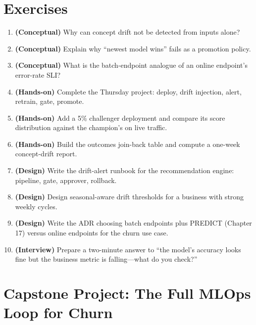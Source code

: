\section{Exercises}
\begin{enumerate}
    \item \textbf{(Conceptual)} Why can concept drift not be detected from inputs alone?
    \item \textbf{(Conceptual)} Explain why ``newest model wins'' fails as a promotion policy.
    \item \textbf{(Conceptual)} What is the batch-endpoint analogue of an online endpoint's error-rate SLI?
    \item \textbf{(Hands-on)} Complete the Thursday project: deploy, drift injection, alert, retrain, gate, promote.
    \item \textbf{(Hands-on)} Add a 5\% challenger deployment and compare its score distribution against the champion's on live traffic.
    \item \textbf{(Hands-on)} Build the outcomes join-back table and compute a one-week concept-drift report.
    \item \textbf{(Design)} Write the drift-alert runbook for the recommendation engine: pipeline, gate, approver, rollback.
    \item \textbf{(Design)} Design seasonal-aware drift thresholds for a business with strong weekly cycles.
    \item \textbf{(Design)} Write the ADR choosing batch endpoints plus PREDICT (Chapter 17) versus online endpoints for the churn use case.
    \item \textbf{(Interview)} Prepare a two-minute answer to ``the model's accuracy looks fine but the business metric is falling---what do you check?''
\end{enumerate}

\section{Capstone Project: The Full MLOps Loop for Churn}\label{sec:ch19-capstone}

